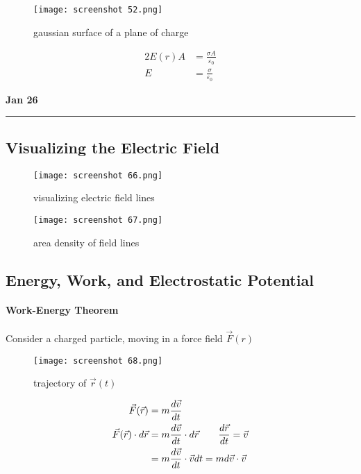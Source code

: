 \documentclass[svgnames]{article}   	%
\begin{document}

\begin{figure}[H]
  \centering
    \texttt{[image: screenshot 52.png]}
    \caption{gaussian surface of a plane of charge}
\end{figure}



\begin{align*}
  2E(r)A &= \frac{\sigma A}{\varepsilon_0} \\
  E &= \frac{\sigma}{\varepsilon_0} 
\end{align*}

\newpage
\noindent \textbf{Jan 26} \hrule
\vspace{10px} 
\subsection{Visualizing the Electric Field}

\begin{figure}[H]
  \centering
    \texttt{[image: screenshot 66.png]}
    \caption{visualizing electric field lines}
\end{figure}



\begin{figure}[H]
  \centering
    \texttt{[image: screenshot 67.png]}
    \caption{area density of field lines}
\end{figure}



\subsection{Energy, Work, and Electrostatic Potential}

\paragraph{Work-Energy Theorem} 

Consider a charged particle, moving in a force field $\vec{F}(r)$
\begin{figure}[H]
  \centering
    \texttt{[image: screenshot 68.png]}
    \caption{trajectory of $\vec{r}(t)$ }
\end{figure}



\begin{align*}
  \vec{F}(\vec{r}) &= m \frac{d \vec{v}}{d t} \\  
  \vec{F}(\vec{r}) \cdot d\vec{r} &= m \frac{d \vec{v}}{d t} \cdot d\vec{r}
  \hspace{20px} \frac{d \vec{r} }{d t} = \vec{v} \\ 
                   &= m \frac{d \vec{v}}{d  t} \cdot \vec{v}dt = m d\vec{v} \cdot \vec{v} 
\end{align*}
\end{document}
